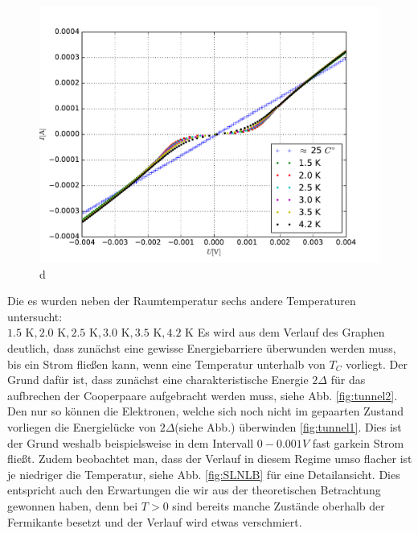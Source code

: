 \documentclass[twoside,        %
               BCOR12mm,       %
               english,ngerman, %
               fleqn,headsepline=false,footsepline=false
              ]{MFPREPORT}
\begin{document}
\begin{figure}
\includegraphics[scale=0.5]{2.pdf}
\caption{d}
\label{fig:SLNL}
\end{figure}
Die es wurden neben der Raumtemperatur sechs andere Temperaturen untersucht:
\\
$1.5 \text{ K}, 2.0 \text{ K}, 2.5 \text{ K}, 3.0  \text{ K}, 3.5 \text{ K}, 4.2 \text{ K}$
Es wird aus dem Verlauf des Graphen deutlich, dass zunächst eine gewisse Energiebarriere überwunden werden muss, bis ein Strom fließen kann, wenn eine Temperatur unterhalb von $T_C$ vorliegt.
Der Grund dafür ist, dass zunächst eine charakteristische Energie $2 \Delta$ für das aufbrechen der Cooperpaare aufgebracht werden muss, siehe Abb. \ref{fig:tunnel2}. 
Den nur so können die Elektronen, welche sich noch nicht im gepaarten Zustand vorliegen die Energielücke von $2 \Delta$(siehe Abb.) überwinden \ref{fig:tunnel1}. Dies ist der Grund weshalb beispielsweise in dem Intervall $0-0.001 V$ fast garkein Strom fließt. 
Zudem beobachtet man, dass der Verlauf in diesem Regime umso flacher ist je niedriger die Temperatur, siehe Abb. \ref{fig:SLNLB} für eine Detailansicht.
Dies entspricht auch den Erwartungen die wir aus der theoretischen Betrachtung gewonnen haben, denn bei $T > 0$ sind bereits manche Zustände oberhalb der Fermikante besetzt und der Verlauf wird etwas verschmiert.
\end{document}
